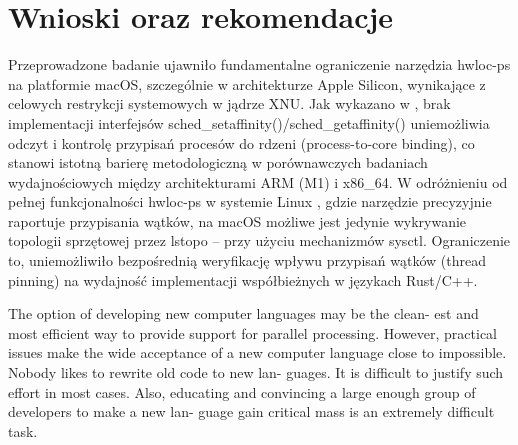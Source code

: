 \chapter{Wnioski oraz rekomendacje}
Przeprowadzone badanie ujawniło fundamentalne ograniczenie narzędzia hwloc-ps na platformie macOS, szczególnie w architekturze Apple Silicon, wynikające z celowych restrykcji systemowych w jądrze XNU. Jak wykazano w \cite{HWLOC555}, brak implementacji interfejsów sched\_setaffinity()/sched\_getaffinity() uniemożliwia odczyt i kontrolę przypisań procesów do rdzeni (process-to-core binding), co stanowi istotną barierę metodologiczną w porównawczych badaniach wydajnościowych między architekturami ARM (M1) i x86\_64. W odróżnieniu od pełnej funkcjonalności hwloc-ps w systemie Linux \cite{hwlocHardwareLocality}, gdzie narzędzie precyzyjnie raportuje przypisania wątków, na macOS możliwe jest jedynie wykrywanie topologii sprzętowej przez lstopo – przy użyciu mechanizmów sysctl. Ograniczenie to, uniemożliwiło bezpośrednią weryfikację wpływu przypisań wątków (thread pinning) na wydajność implementacji współbieżnych w językach Rust/C++.

The option of developing new computer languages may be the clean- est and most efficient way to provide support for parallel processing. However, practical issues make the wide acceptance of a new computer language close to impossible. Nobody likes to rewrite old code to new lan- guages. It is difficult to justify such effort in most cases. Also, educating and convincing a large enough group of developers to make a new lan- guage gain critical mass is an extremely difficult task.